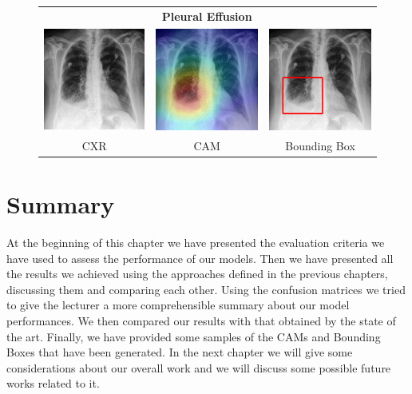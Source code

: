 \begin{figure}[htbp!]
\centering
\begin{tabular}{ccc}
 &\textbf{Pleural Effusion}& \\
\vspace{2mm}
  \includegraphics[width=35mm]{Tesi/images/CAMs/CAM13/image.png} &   
  \includegraphics[width=35mm]{Tesi/images/CAMs/CAM13/image_cam.png} &   
  \includegraphics[width=35mm]{Tesi/images/CAMs/CAM13/image_bbox.png} \\
\footnotesize{CXR} & \footnotesize{CAM} & \footnotesize{Bounding Box} \\[6pt]
\end{tabular}
\caption[Pleural Effusion CAM-2]{}
\label{fig:figure_5.27}
\end{figure}



\section{Summary}
\label{sec:chapter_5_summary}
At the beginning of this chapter we have presented the evaluation criteria we have used to assess the performance of our models. Then we have presented all the results we achieved using the approaches defined in the previous chapters, discussing them and comparing each other. Using the confusion matrices we tried to give the lecturer a more comprehensible summary about our model performances. We then compared our results with that obtained by the state of the art. Finally, we have provided some samples of the \acp{CAM} and Bounding Boxes that have been generated. In the next chapter we will give some considerations about our overall work and we will discuss some possible future works related to it.